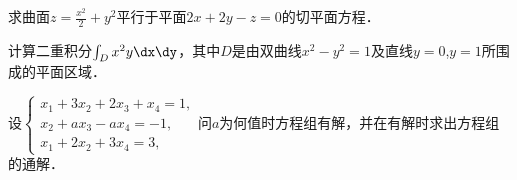 \documentclass[plain,noanswer,medmath]{../../template/jnuexam}
\begin{document}
































\begin{problem}
求曲面$z = \frac{x^2}{2} + y^2$平行于平面$2x + 2y - z = 0$的切平面方程．
\end{problem}


\begin{problem}
计算二重积分$\int_D x^2 y\dx\dy$，其中$D$是由双曲线$x^2 - y^2 = 1$及直线$y = 0$,$y = 1$所围成的平面区域．
\end{problem}



















\begin{problem}
设$\begin{cases}
  x_1 + 3x_2 + 2x_3 + x_4 = 1, \\
  x_2 + ax_3 - ax_4 = - 1, \\
  x_1 + 2x_2 + 3x_4 = 3,
\end{cases}$问$a$为何值时方程组有解，并在有解时求出方程组的通解．
\end{problem}





\end{document}
